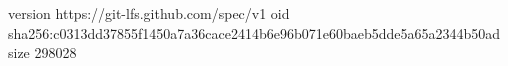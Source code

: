 version https://git-lfs.github.com/spec/v1
oid sha256:c0313dd37855f1450a7a36cace2414b6e96b071e60baeb5dde5a65a2344b50ad
size 298028
